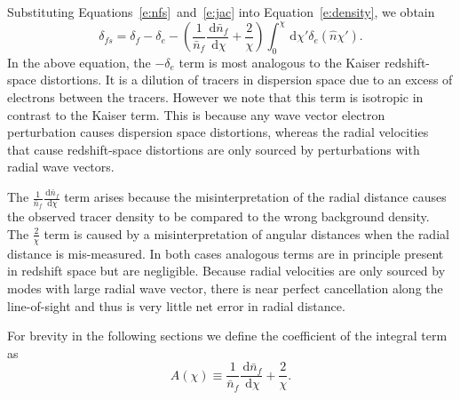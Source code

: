 \documentclass[twocolumn,prl,floatfix]{revtex4-1}
\makeatletter
\newcommand{\ud}{\,\mathrm{d}}
\def\ignorespacesandimplicitepars{%
  \begingroup
  \catcode13=10
  \@ifnextchar\relax
    {\endgroup}%
    {\endgroup}%
}
\renewcommand{\section}[1]{\emph{#1}---\ignorespacesandimplicitepars}
\makeatother
\begin{document}
Substituting Equations~\ref{e:nfs}~and~\ref{e:jac} into Equation~\ref{e:density},
we obtain
\begin{equation}
\label{e:delta_s}
    \delta_{fs} = \delta_f - \delta_e
    - \left(\frac{1}{\bar{n}_f}\frac{\ud \bar{n}_f}{\ud \chi}
    + \frac{2}{\chi} \right)
        \int_0^\chi \ud \chi' \delta_e(\hat n \chi').
\end{equation}
In the above equation, the $-\delta_e$ term is most analogous to the Kaiser
redshift-space distortions.  It is a dilution of tracers in dispersion space due to an
excess of electrons between the tracers. However we note that this term is isotropic
in contrast to the Kaiser term.  This is because any wave vector electron perturbation
causes dispersion space distortions, whereas the radial velocities that cause
redshift-space distortions are only sourced by perturbations with radial wave
vectors.

The $\frac{1}{\bar{n}_f}\frac{\ud \bar{n}_f}{\ud \chi}$ term arises because the
misinterpretation of the radial distance causes the observed tracer density to
be compared to the wrong background density. The $\frac{2}{\chi}$ term is
caused by a misinterpretation of angular distances when the radial distance is
mis-measured.  In both cases analogous terms are in principle present in 
redshift space but are
negligible. Because radial velocities are only sourced by modes with large
radial wave vector, there is near perfect cancellation along the line-of-sight
and thus is very little net error in radial distance.

For brevity in the following sections we define the coefficient of the integral
term as
\begin{equation}
    \label{e:A}
    A(\chi) \equiv \frac{1}{\bar{n}_f}\frac{\ud \bar{n}_f}{\ud \chi}
    + \frac{2}{\chi}.
\end{equation}


\end{document}
